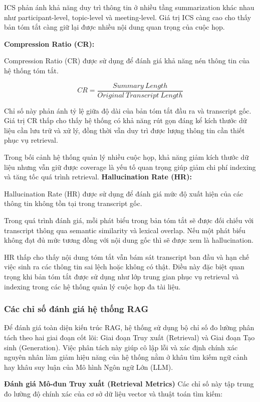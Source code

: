 ICS phản ánh khả năng duy trì thông tin ở nhiều tầng summarization khác nhau như participant-level, topic-level và meeting-level. Giá trị ICS càng cao cho thấy bản tóm tắt càng giữ lại được nhiều nội dung quan trọng của cuộc họp.

\textbf{Compression Ratio (CR):}

Compression Ratio (CR) được sử dụng để đánh giá khả năng nén thông tin của hệ thống tóm tắt.

\[
CR = \frac{Summary\ Length}{Original\ Transcript\ Length}
\]

Chỉ số này phản ánh tỷ lệ giữa độ dài của bản tóm tắt đầu ra và transcript gốc. Giá trị CR thấp cho thấy hệ thống có khả năng rút gọn đáng kể kích thước dữ liệu cần lưu trữ và xử lý, đồng thời vẫn duy trì được lượng thông tin cần thiết phục vụ retrieval.

Trong bối cảnh hệ thống quản lý nhiều cuộc họp, khả năng giảm kích thước dữ liệu nhưng vẫn giữ được coverage là yếu tố quan trọng giúp giảm chi phí indexing và tăng tốc quá trình retrieval.
\textbf{Hallucination Rate (HR):}

Hallucination Rate (HR) được sử dụng để đánh giá mức độ xuất hiện của các thông tin không tồn tại trong transcript gốc.

Trong quá trình đánh giá, mỗi phát biểu trong bản tóm tắt sẽ được đối chiếu với transcript thông qua semantic similarity và lexical overlap. Nếu một phát biểu không đạt đủ mức tương đồng với nội dung gốc thì sẽ được xem là hallucination.

HR thấp cho thấy nội dung tóm tắt vẫn bám sát transcript ban đầu và hạn chế việc sinh ra các thông tin sai lệch hoặc không có thật. Điều này đặc biệt quan trọng khi bản tóm tắt được sử dụng như lớp trung gian phục vụ retrieval và indexing trong các hệ thống quản lý cuộc họp đa tài liệu.

\subsubsection{Các chỉ số đánh giá hệ thống RAG}

Để đánh giá toàn diện kiến trúc RAG, hệ thống sử dụng bộ chỉ số đo lường phân tách theo hai giai đoạn cốt lõi: Giai đoạn Truy xuất (Retrieval) và Giai đoạn Tạo sinh (Generation). Việc phân tách này giúp cô lập lỗi và xác định chính xác nguyên nhân làm giảm hiệu năng của hệ thống nằm ở khâu tìm kiếm ngữ cảnh hay khâu suy luận của Mô hình Ngôn ngữ Lớn (LLM).

\textbf{Đánh giá Mô-đun Truy xuất (Retrieval Metrics)}
Các chỉ số này tập trung đo lường độ chính xác của cơ sở dữ liệu vector và thuật toán tìm kiếm:

